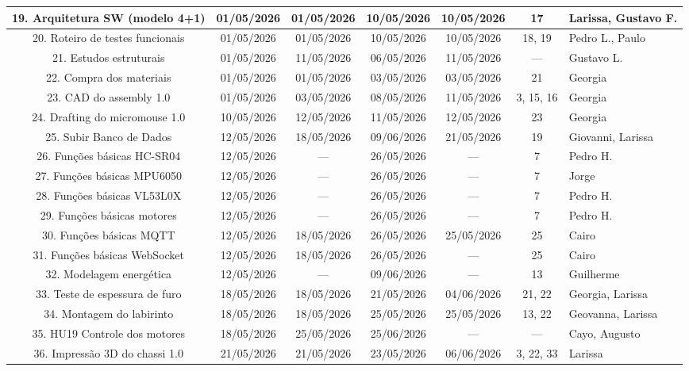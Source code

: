 \begin{landscape}
\begin{center}
\begin{longtable}{|c|c|c|c|c|c|p{3.6cm}|}
19. Arquitetura SW (modelo 4+1) & 01/05/2026 & 01/05/2026 & 10/05/2026 & 10/05/2026 & 17 & Larissa, Gustavo F. \\ \hline
20. Roteiro de testes funcionais & 01/05/2026 & 01/05/2026 & 10/05/2026 & 10/05/2026 & 18, 19 & Pedro L., Paulo \\ \hline
21. Estudos estruturais & 01/05/2026 & 11/05/2026 & 06/05/2026 & 11/05/2026 & --- & Gustavo L. \\ \hline
22. Compra dos materiais & 01/05/2026 & 01/05/2026 & 03/05/2026 & 03/05/2026 & 21 & Georgia \\ \hline
23. CAD do assembly 1.0 & 01/05/2026 & 03/05/2026 & 08/05/2026 & 11/05/2026 & 3, 15, 16 & Georgia \\ \hline
24. Drafting do micromouse 1.0 & 10/05/2026 & 12/05/2026 & 11/05/2026 & 12/05/2026 & 23 & Georgia \\ \hline
25. Subir Banco de Dados & 12/05/2026 & 18/05/2026 & 09/06/2026 & 21/05/2026 & 19 & Giovanni, Larissa \\ \hline
26. Funções básicas HC-SR04 & 12/05/2026 & --- & 26/05/2026 & --- & 7 & Pedro H. \\ \hline
27. Funções básicas MPU6050 & 12/05/2026 & --- & 26/05/2026 & --- & 7 & Jorge \\ \hline
28. Funções básicas VL53L0X & 12/05/2026 & --- & 26/05/2026 & --- & 7 & Pedro H. \\ \hline
29. Funções básicas motores & 12/05/2026 & --- & 26/05/2026 & --- & 7 & Pedro H. \\ \hline
30. Funções básicas MQTT & 12/05/2026 & 18/05/2026 & 26/05/2026 & 25/05/2026 & 25 & Cairo \\ \hline
31. Funções básicas WebSocket & 12/05/2026 & 18/05/2026 & 26/05/2026 & --- & 25 & Cairo \\ \hline
32. Modelagem energética & 12/05/2026 & --- & 09/06/2026 & --- & 13 & Guilherme \\ \hline
33. Teste de espessura de furo & 18/05/2026 & 18/05/2026 & 21/05/2026 & 04/06/2026 & 21, 22 & Georgia, Larissa \\ \hline
34. Montagem do labirinto & 18/05/2026 & 18/05/2026 & 25/05/2026 & 25/05/2026 & 13, 22 & Geovanna, Larissa \\ \hline
35. HU19 Controle dos motores & 18/05/2026 & 25/05/2026 & 25/06/2026 & --- & --- & Cayo, Augusto \\ \hline
36. Impressão 3D do chassi 1.0 & 21/05/2026 & 21/05/2026 & 23/05/2026 & 06/06/2026 & 3, 22, 33 & Larissa \\ \hline

\end{longtable}
\end{center}
\end{landscape}
